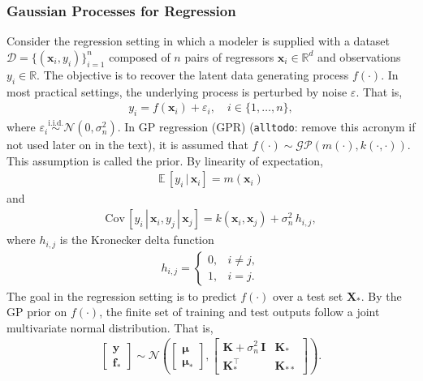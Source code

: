 \documentclass[journal=jacsat,manuscript=article]{achemso}
\newcommand{\alltodo}[1]{{\color{Cyan} (\texttt{alltodo}: #1)}}
\newcommand{\reals}{\ensuremath{\mathbb{R}}}
\newcommand{\xvec}{\ensuremath{\mathbf{x}}}
\newcommand{\xmatrix}{\ensuremath{\mathbf{X}}}
\begin{document}
 \subsubsection{Gaussian Processes for Regression}
 Consider the regression setting in which a modeler is supplied with a dataset $\mathcal{D} = \{(\xvec_i, y_i)\}_{i=1}^n$ composed of $n$ pairs of regressors $\xvec_i \in \reals^d$ and observations $y_i \in \reals$. The objective is to recover the latent data generating process $f(\cdot)$. In most practical settings, the underlying process is perturbed by noise $\varepsilon$. That is,
 \begin{gather*}
     y_i = f(\xvec_i) + \varepsilon_i, \quad i \in \{1,\dots, n\},
 \end{gather*}
 where $\varepsilon_i \stackrel{\text{i.i.d.}}{\sim} \mathcal{N}(0,\sigma_n^2)$. In GP regression (GPR) \alltodo{remove this acronym if not used later on in the text}, it is assumed that $f(\cdot)\sim \mathcal{GP}(m(\cdot),k(\cdot,\cdot))$. This assumption is called the prior. By linearity of expectation,
 \begin{gather*}
     \mathbb{E}\,[y_i\,|\,\xvec_i] = m(\xvec_i)
 \end{gather*}
 and
 \begin{gather*}
     \text{Cov}\,[y_i\, | \,\xvec_i, y_j \, | \,\xvec_j] = k(\xvec_i, \xvec_j) + \sigma_n^2 \,h_{i,j},
 \end{gather*}
 where $h_{i,j}$ is the Kronecker delta function
 \begin{gather*}
     h_{i,j} = 
     \begin{cases}
         0, & i\neq j,\\
         1, & i= j.
     \end{cases}
 \end{gather*}
 The goal in the regression setting is to predict $f(\cdot)$ over a test set $\xmatrix_*$. By the GP prior on $f(\cdot)$, the finite set of training and test outputs follow a joint multivariate normal distribution. That is,
 \begin{gather*}
     \begin{bmatrix}
         \mathbf{y} \\
         \mathbf{f}_*
     \end{bmatrix}
     \sim 
     \mathcal{N}\left(
     \begin{bmatrix}
         \boldsymbol{\mu}\\
         \boldsymbol{\mu}_*
     \end{bmatrix},
     \begin{bmatrix}
         \mathbf{K} +\sigma_n^2\,\mathbf{I} & \mathbf{K}_* \\
         \mathbf{K}^\intercal_* & \mathbf{K}_{**}
     \end{bmatrix} \right).
 \end{gather*}
\end{document}
